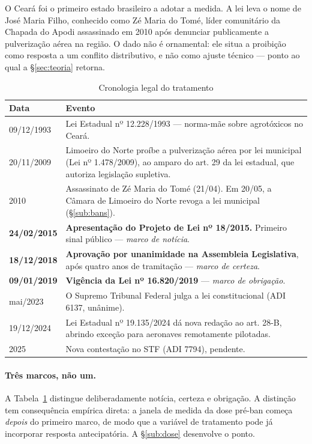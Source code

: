 O Ceará foi o primeiro estado brasileiro a adotar a medida. A lei leva o nome de
José Maria Filho, conhecido como Zé Maria do Tomé, líder comunitário da Chapada
do Apodi assassinado em 2010 após denunciar publicamente a pulverização aérea na
região. O dado não é ornamental: ele situa a proibição como resposta a um
conflito distributivo, e não como ajuste técnico --- ponto ao qual a
§\ref{sec:teoria} retorna.

\begin{table}[htbp]
\centering
\caption{Cronologia legal do tratamento}
\label{tab:cronologia}
\small
\begin{tabular}{lp{10.5cm}}
\hline
Data & Evento \\
\hline
09/12/1993 & Lei Estadual nº 12.228/1993 --- norma-mãe sobre agrotóxicos no Ceará. \\
20/11/2009 & Limoeiro do Norte proíbe a pulverização aérea por lei municipal (Lei nº 1.478/2009), ao amparo do art. 29 da lei estadual, que autoriza legislação supletiva. \\
2010 & Assassinato de Zé Maria do Tomé (21/04). Em 20/05, a Câmara de Limoeiro do Norte revoga a lei municipal (§\ref{sub:bans}). \\
\textbf{24/02/2015} & \textbf{Apresentação do Projeto de Lei nº 18/2015.} Primeiro sinal público --- \emph{marco de notícia}. \\
\textbf{18/12/2018} & \textbf{Aprovação por unanimidade na Assembleia Legislativa}, após quatro anos de tramitação --- \emph{marco de certeza}. \\
\textbf{09/01/2019} & \textbf{Vigência da Lei nº 16.820/2019} --- \emph{marco de obrigação}. \\
mai/2023 & O Supremo Tribunal Federal julga a lei constitucional (ADI 6137, unânime). \\
19/12/2024 & Lei Estadual nº 19.135/2024 dá nova redação ao art. 28-B, abrindo exceção para aeronaves remotamente pilotadas. \\
2025 & Nova contestação no STF (ADI 7794), pendente. \\
\hline
\end{tabular}
\end{table}

\paragraph{Três marcos, não um.} A Tabela~\ref{tab:cronologia} distingue
deliberadamente notícia, certeza e obrigação. A distinção tem consequência
empírica direta: a janela de medida da dose pré-ban começa \emph{depois} do
primeiro marco, de modo que a variável de tratamento pode já incorporar resposta
antecipatória. A §\ref{sub:dose} desenvolve o ponto.


